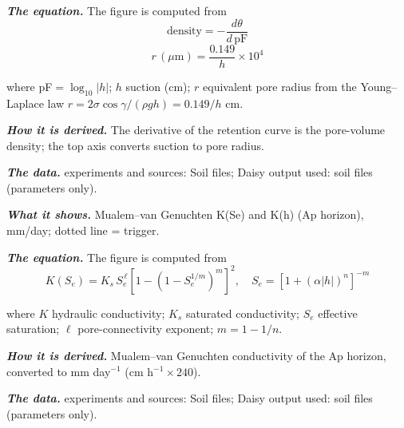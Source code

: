 \par\noindent\textbf{\color{khmag}\emph{The equation.}} The figure is computed from
\begin{equation}\boxed{\text{density}=-\dfrac{d\theta}{d\,\mathrm{pF}}}\end{equation}
\begin{equation}\boxed{r\,(\mu\mathrm{m})=\dfrac{0.149}{h}\times10^{4}}\end{equation}
\par\noindent where pF$=\log_{10}|h|$; $h$ suction (cm); $r$ equivalent pore radius from the Young--Laplace law $r=2\sigma\cos\gamma/(\rho g h)=0.149/h$ cm.
\par\noindent\textbf{\color{khmag}\emph{How it is derived.}} The derivative of the retention curve is the pore-volume density; the top axis converts suction to pore radius.
\par\noindent\textbf{\color{khmag}\emph{The data.}} experiments and sources: Soil files; Daisy output used: soil files (parameters only).
\par\vspace{6pt}\noindent{}\par\nobreak
{}\label{fig:a19_8}
\par\noindent\textbf{\color{khmag}\emph{What it shows.}} Mualem--van Genuchten K(Se) and K(h) (Ap horizon), mm/day; dotted line = trigger.
\par\noindent\textbf{\color{khmag}\emph{The equation.}} The figure is computed from
\begin{equation}\boxed{K(S_e)=K_s\,S_e^{\,\ell}\left[1-\left(1-S_e^{1/m}\right)^{m}\right]^{2},\quad S_e=\left[1+(\alpha|h|)^{n}\right]^{-m}}\end{equation}
\par\noindent where $K$ hydraulic conductivity; $K_s$ saturated conductivity; $S_e$ effective saturation; $\ell$ pore-connectivity exponent; $m=1-1/n$.
\par\noindent\textbf{\color{khmag}\emph{How it is derived.}} Mualem--van Genuchten conductivity of the Ap horizon, converted to mm day$^{-1}$ (cm h$^{-1}\times240$).
\par\noindent\textbf{\color{khmag}\emph{The data.}} experiments and sources: Soil files; Daisy output used: soil files (parameters only).
\par\vspace{6pt}\noindent{}\par\nobreak
